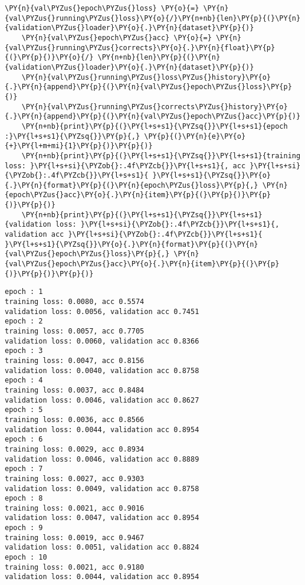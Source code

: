 \begin{tcolorbox}[breakable, size=fbox, boxrule=1pt, pad at break*=1mm,colback=cellbackground, colframe=cellborder]
\begin{Verbatim}[commandchars=\\\{\}]
    \PY{n}{val\PYZus{}epoch\PYZus{}loss} \PY{o}{=} \PY{n}{val\PYZus{}running\PYZus{}loss}\PY{o}{/}\PY{n+nb}{len}\PY{p}{(}\PY{n}{validation\PYZus{}loader}\PY{o}{.}\PY{n}{dataset}\PY{p}{)}
    \PY{n}{val\PYZus{}epoch\PYZus{}acc} \PY{o}{=} \PY{n}{val\PYZus{}running\PYZus{}corrects}\PY{o}{.}\PY{n}{float}\PY{p}{(}\PY{p}{)}\PY{o}{/} \PY{n+nb}{len}\PY{p}{(}\PY{n}{validation\PYZus{}loader}\PY{o}{.}\PY{n}{dataset}\PY{p}{)}
    \PY{n}{val\PYZus{}running\PYZus{}loss\PYZus{}history}\PY{o}{.}\PY{n}{append}\PY{p}{(}\PY{n}{val\PYZus{}epoch\PYZus{}loss}\PY{p}{)}
    \PY{n}{val\PYZus{}running\PYZus{}corrects\PYZus{}history}\PY{o}{.}\PY{n}{append}\PY{p}{(}\PY{n}{val\PYZus{}epoch\PYZus{}acc}\PY{p}{)}
    \PY{n+nb}{print}\PY{p}{(}\PY{l+s+s1}{\PYZsq{}}\PY{l+s+s1}{epoch :}\PY{l+s+s1}{\PYZsq{}}\PY{p}{,} \PY{p}{(}\PY{n}{e}\PY{o}{+}\PY{l+m+mi}{1}\PY{p}{)}\PY{p}{)}
    \PY{n+nb}{print}\PY{p}{(}\PY{l+s+s1}{\PYZsq{}}\PY{l+s+s1}{training loss: }\PY{l+s+si}{\PYZob{}:.4f\PYZcb{}}\PY{l+s+s1}{, acc }\PY{l+s+si}{\PYZob{}:.4f\PYZcb{}}\PY{l+s+s1}{ }\PY{l+s+s1}{\PYZsq{}}\PY{o}{.}\PY{n}{format}\PY{p}{(}\PY{n}{epoch\PYZus{}loss}\PY{p}{,} \PY{n}{epoch\PYZus{}acc}\PY{o}{.}\PY{n}{item}\PY{p}{(}\PY{p}{)}\PY{p}{)}\PY{p}{)}
    \PY{n+nb}{print}\PY{p}{(}\PY{l+s+s1}{\PYZsq{}}\PY{l+s+s1}{validation loss: }\PY{l+s+si}{\PYZob{}:.4f\PYZcb{}}\PY{l+s+s1}{, validation acc }\PY{l+s+si}{\PYZob{}:.4f\PYZcb{}}\PY{l+s+s1}{ }\PY{l+s+s1}{\PYZsq{}}\PY{o}{.}\PY{n}{format}\PY{p}{(}\PY{n}{val\PYZus{}epoch\PYZus{}loss}\PY{p}{,} \PY{n}{val\PYZus{}epoch\PYZus{}acc}\PY{o}{.}\PY{n}{item}\PY{p}{(}\PY{p}{)}\PY{p}{)}\PY{p}{)}
\end{Verbatim}
\end{tcolorbox}

    \begin{Verbatim}[commandchars=\\\{\}]
epoch : 1
training loss: 0.0080, acc 0.5574
validation loss: 0.0056, validation acc 0.7451
epoch : 2
training loss: 0.0057, acc 0.7705
validation loss: 0.0060, validation acc 0.8366
epoch : 3
training loss: 0.0047, acc 0.8156
validation loss: 0.0040, validation acc 0.8758
epoch : 4
training loss: 0.0037, acc 0.8484
validation loss: 0.0046, validation acc 0.8627
epoch : 5
training loss: 0.0036, acc 0.8566
validation loss: 0.0044, validation acc 0.8954
epoch : 6
training loss: 0.0029, acc 0.8934
validation loss: 0.0046, validation acc 0.8889
epoch : 7
training loss: 0.0027, acc 0.9303
validation loss: 0.0049, validation acc 0.8758
epoch : 8
training loss: 0.0021, acc 0.9016
validation loss: 0.0047, validation acc 0.8954
epoch : 9
training loss: 0.0019, acc 0.9467
validation loss: 0.0051, validation acc 0.8824
epoch : 10
training loss: 0.0021, acc 0.9180
validation loss: 0.0044, validation acc 0.8954
    \end{Verbatim}

